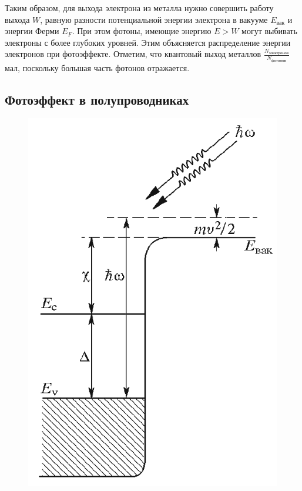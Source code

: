 \documentclass[a4paper, 12pt]{article} %
\begin{document}
	Таким образом, для выхода электрона из металла нужно совершить работу выхода $W$, равную разности потенциальной энергии электрона в вакууме $E_{\text{вак}}$ и энергии Ферми $E_F$. При этом фотоны, имеющие энергию $E > W$ могут выбивать электроны с более глубоких уровней. Этим объясняется распределение энергии электронов при фотоэффекте. Отметим, что квантовый выход металлов $\frac{N_{\text{электронов}}}{N_{\text{фотонов}}}$ мал, поскольку большая часть фотонов отражается.

\newpage

\subsection{Фотоэффект в полупроводниках}
	\begin{figure}
		\includegraphics[scale=0.6]{res/semiconductor.png}
		\label{fig:semiconductor}
		\vspace{0pt}
	\end{figure}
	
\end{document}
